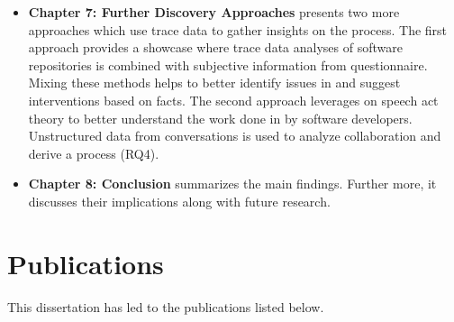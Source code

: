 \begin{itemize}
	\item \textbf{Chapter 7: Further Discovery Approaches} presents two more approaches which use trace data to gather insights on the process. The first approach provides a showcase where trace data analyses of software repositories is combined with subjective information from questionnaire. Mixing these methods helps to better identify issues in and suggest interventions based on facts. The second approach leverages on speech act theory to better understand the work done in by software developers. Unstructured data from conversations is used to analyze collaboration and derive a process (RQ4).
	
	\item \textbf{Chapter 8: Conclusion} summarizes the main findings. Further more, it discusses their implications along with future research. 
	 	
\end{itemize}


\section{Publications}
\label{sec:intro-related-publications}

This dissertation has led to the publications listed below.\\

